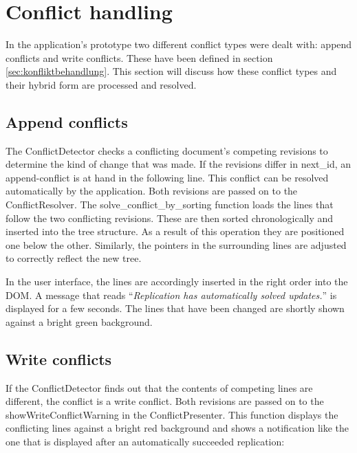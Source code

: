 \section{Conflict handling}

In the application's prototype two different conflict types were dealt with: append conflicts and write conflicts. These have been defined in section \ref{sec:konfliktbehandlung}. This section will discuss how these conflict types and their hybrid form are processed and resolved.

\subsection{Append conflicts}
\label{subsec:appendconflict-implementierung}

The {\selectfont ConflictDetector} checks a conflicting document's competing revisions to determine the kind of change that was made. If the revisions differ in {\selectfont next\_id}, an append-conflict is at hand in the following line. This conflict can be resolved automatically by the application. Both revisions are passed on to the {\selectfont ConflictResolver}. The {\selectfont solve\_conflict\_by\_sorting} function loads the lines that follow the two conflicting revisions. These are then sorted chronologically and inserted into the tree structure. As a result of this operation they are positioned one below the other. Similarly, the pointers in the surrounding lines are adjusted to correctly reflect the new tree.

In the user interface, the lines are accordingly inserted in the right order into the DOM. A message that reads \enquote{\textit{Replication has automatically solved updates.}} is displayed for a few seconds. The lines that have been changed are shortly shown against a bright green background.


\subsection{Write conflicts}
\label{subsec:writeconflict-implementierung}

If the {\selectfont ConflictDetector} finds out that the contents of competing lines are different, the conflict is a write conflict. Both revisions are passed on to the {\selectfont showWriteConflictWarning} in the {\selectfont ConflictPresenter}. This function displays the conflicting lines against a bright red background and shows a notification like the one that is displayed after an automatically succeeded replication:

